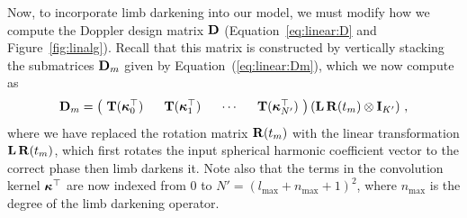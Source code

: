 \documentclass[modern]{aastex631}
\begin{document}
Now, to incorporate limb darkening into our model, we must modify how we compute the Doppler design matrix ${\mathbf{D}}$ (Equation~\ref{eq:linear:D} and Figure~\ref{fig:linalg}). 
Recall that this matrix is constructed by vertically stacking the submatrices ${\mathbf{D}}_m$ given by Equation~(\ref{eq:linear:Dm}), which we now compute as
%
\begin{align}
    \label{eq:ld:Dm}
    {\ensuremath{\mathbf{D}}}_m =
    \begin{pmatrix}
        \hskip 0.33em
        {\mathbf{T}}(\boldsymbol{\kappa}^\top_0)
        \hskip 0.33em
         &
        \hskip 0.33em
        {\mathbf{T}}(\boldsymbol{\kappa}^\top_1)
        \hskip 0.33em
         &
        \hskip 0.33em
        \cdots
        \hskip 0.33em
         &
        \hskip 0.33em
        {\mathbf{T}}(\boldsymbol{\kappa}^\top_{N'})
        \hskip 0.33em
    \end{pmatrix}
    ({\mathbf{L}} \, {\mathbf{R}}(t_m) \otimes {\ensuremath{\mathbf{I}}}_{K'})
    \hskip 0.33em,
\end{align}
%
where we have replaced the rotation matrix ${\mathbf{R}}(t_m)$ with the linear transformation ${\mathbf{L}}\,{\mathbf{R}}(t_m)$, which first rotates the input spherical harmonic coefficient vector to the correct phase then limb darkens it. 
Note also that the terms in the convolution kernel $\boldsymbol{\kappa}^\top$ are now indexed from 0 to $N' = (l_\mathrm{max} + n_\mathrm{max} + 1)^2$, where $n_\mathrm{max}$ is the degree of the limb darkening operator.
\end{document}
